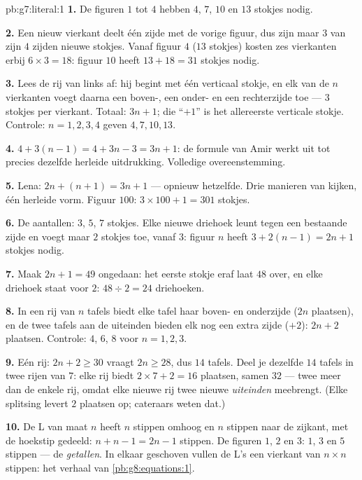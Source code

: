 \begin{solution}{pb:g7:literal:1}
\textbf{1.} De figuren $1$ tot $4$ hebben $4$, $7$, $10$ en $13$ stokjes nodig.

\textbf{2.} Een nieuw vierkant deelt één zijde met de vorige figuur, dus zijn maar
$3$ van zijn $4$ zijden nieuwe stokjes. Vanaf figuur $4$ ($13$ stokjes) kosten zes
vierkanten erbij $6 \times 3 = 18$: figuur $10$ heeft $13 + 18 = 31$ stokjes
nodig.

\textbf{3.} Lees de rij van links af: hij begint met één verticaal stokje, en elk
van de $n$ vierkanten voegt daarna een boven-, een onder- en een rechterzijde toe
--- $3$ stokjes per vierkant. Totaal: $3n + 1$; die ``$+1$'' is het allereerste
verticale stokje. Controle: $n = 1, 2, 3, 4$ geven $4, 7, 10, 13$.

\textbf{4.} $4 + 3(n - 1) = 4 + 3n - 3 = 3n + 1$: de formule van Amir werkt uit
tot precies dezelfde herleide uitdrukking. Volledige overeenstemming.

\textbf{5.} Lena: $2n + (n + 1) = 3n + 1$ --- opnieuw hetzelfde. Drie manieren van
kijken, één herleide vorm. Figuur $100$: $3 \times 100 + 1 = 301$ stokjes.

\textbf{6.} De aantallen: $3$, $5$, $7$ stokjes. Elke nieuwe driehoek leunt tegen
een bestaande zijde en voegt maar $2$ stokjes toe, vanaf $3$: figuur $n$ heeft
$3 + 2(n - 1) = 2n + 1$ stokjes nodig.

\textbf{7.} Maak $2n + 1 = 49$ ongedaan: het eerste stokje eraf laat $48$ over, en
elke driehoek staat voor $2$: $48 \div 2 = 24$ driehoeken.

\textbf{8.} In een rij van $n$ tafels biedt elke tafel haar boven- en onderzijde
($2n$ plaatsen), en de twee tafels aan de uiteinden bieden elk nog een extra zijde
($+2$): $2n + 2$ plaatsen. Controle: $4$, $6$, $8$ voor $n = 1, 2, 3$.

\textbf{9.} Eén rij: $2n + 2 \geq 30$ vraagt $2n \geq 28$, dus $14$ tafels. Deel je
dezelfde $14$ tafels in twee rijen van $7$: elke rij biedt $2 \times 7 + 2 = 16$
plaatsen, samen $32$ --- twee meer dan de enkele rij, omdat elke nieuwe rij twee
nieuwe \emph{uiteinden} meebrengt. (Elke splitsing levert $2$ plaatsen op;
cateraars weten dat.)

\textbf{10.} De L van maat $n$ heeft $n$ stippen omhoog en $n$ stippen naar de
zijkant, met de hoekstip gedeeld: $n + n - 1 = 2n - 1$ stippen. De figuren $1$,
$2$ en $3$: $1$, $3$ en $5$ stippen --- de \emph{ getallen}. In elkaar
geschoven vullen de L's een vierkant van $n \times n$ stippen: het verhaal van
\cref{pb:g8:equations:1}.


\end{solution}
